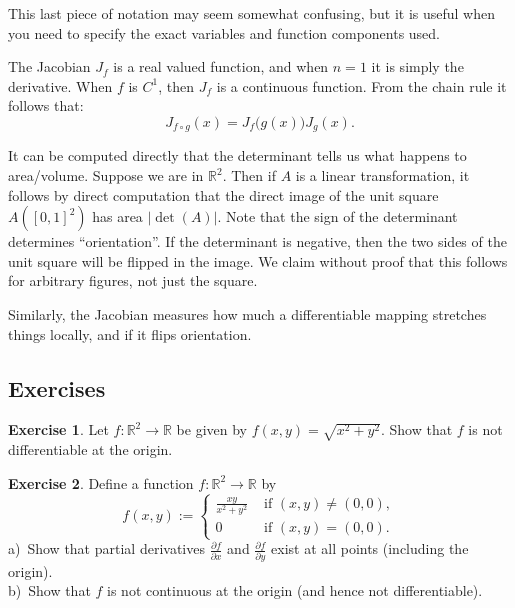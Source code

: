 \documentclass[12pt]{book}
\newcommand{\abs}[1]{\left\lvert {#1} \right\rvert}
\newcommand{\R}{{\mathbb{R}}}
\theoremstyle{plain}
\theoremstyle{remark}
\theoremstyle{definition}
\theoremstyle{exercise}
\newtheorem{exercise}{Exercise}[section]
\theoremstyle{example}
\begin{document}
This last piece of notation may seem somewhat confusing,
but it is useful when you need to specify
the exact variables and function components used.

The Jacobian $J_f$ is a real valued function, and when $n=1$ it is simply the
derivative.
When $f$ is $C^1$, then $J_f$ is a continuous function.
From the chain rule it follows that:
\begin{equation*}
J_{f \circ g} (x) = J_f\bigl(g(x)\bigr) J_g(x) .
\end{equation*}

It can be computed directly that the determinant tells us what happens to
area/volume.  Suppose we are in $\R^2$.  Then if $A$ is a linear
transformation, it follows by direct computation that the
direct image of the unit square $A([0,1]^2)$ has area 
$\abs{\det(A)}$.  Note that the sign of the determinant determines
``orientation''.  If the determinant is negative, then the two sides of the
unit square will be flipped in the image.  We claim without proof that
this follows for arbitrary figures, not just the square.

Similarly, the Jacobian measures how much a differentiable mapping stretches
things locally, and if it flips orientation.

\subsection{Exercises}

\begin{exercise}
Let $f \colon \R^2 \to \R$ be given by
$f(x,y)
=
\sqrt{x^2+y^2}$.
Show that $f$ is not differentiable at the origin.
\end{exercise}

\begin{exercise}
Define a function $f \colon \R^2 \to \R$ by
\begin{equation*}
f(x,y)
:=
\begin{cases}
\frac{xy}{x^2+y^2} & \text{ if $(x,y) \not= (0,0)$}, \\
0 & \text{ if $(x,y) = (0,0)$}.
\end{cases}
\end{equation*}
a)~Show that partial derivatives 
$\frac{\partial f}{\partial x}$ and
$\frac{\partial f}{\partial y}$ exist at all points (including the origin).\\
b)~Show that $f$ is not continuous at the origin (and hence not
differentiable).
\end{exercise}
\end{document}
